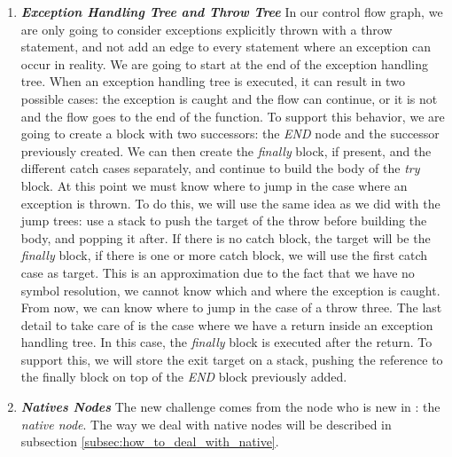 \begin{enumerate}
	\item \textbf{\textit{Exception Handling Tree and Throw Tree}} \newline 
	\label{subsubsec:exception_handling_cfg}
	In our control flow graph, we are only going to consider exceptions explicitly thrown with a throw statement, and not add an edge to every statement where an exception can occur in reality. \newline
	We are going to start at the end of the exception handling tree. 
	When an exception handling tree is executed, it can result in two possible cases: the exception is caught and the flow can continue, or it is not and the flow goes to the end of the function. 
	To support this behavior, we are going to create a block with two successors: the \emph{END} node and the successor previously created. \newline
	We can then create the \emph{finally} block, if present, and the different catch cases separately, and continue to build the body of the \emph{try} block. 
	At this point we must know where to jump in the case where an exception is thrown. 
	To do this, we will use the same idea as we did with the jump trees: use a stack to push the target of the throw before building the body, and popping it after. 
	If there is no catch block, the target will be the \emph{finally} block, if there is one or more catch block, we will use the first catch case as target. 
	This is an approximation due to the fact that we have no symbol resolution, we cannot know which and where the exception is caught.
	From now, we can know where to jump in the case of a throw three.\newline
	The last detail to take care of is the case where we have a return inside an exception handling tree.
	In this case, the \emph{finally} block is executed after the return. 
	To support this, we will store the exit target on a stack, pushing the reference to the finally block on top of the \emph{END} block previously added.
	
	\item \textbf{\textit{Natives Nodes}} \newline 
	\label{subsubsec:native_nodes_cfg}
	The new challenge comes from the node who is new in \slang{}: the \emph{native node}. 
	The way we deal with native nodes will be described in subsection \ref{subsec:how_to_deal_with_native}.
\end{enumerate}

